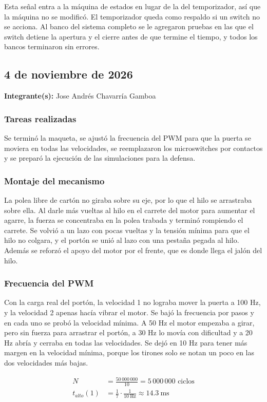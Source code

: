 \documentclass[11pt,letterpaper]{article}
\newcommand{\entrada}[2]{%
  \subsection*{#1}%
  \addcontentsline{toc}{subsection}{#1}%
  \noindent\textbf{Integrante(s):} #2\par\medskip
}
\begin{document}
Esta señal entra a la máquina de estados en lugar de la del temporizador, así que la máquina no se modificó. El temporizador queda como respaldo si un switch no se acciona. Al banco del sistema completo se le agregaron pruebas en las que el switch detiene la apertura y el cierre antes de que termine el tiempo, y todos los bancos terminaron sin errores.

\entrada{4 de noviembre de 2026}{Jose Andrés Chavarría Gamboa}

\subsubsection*{Tareas realizadas}

Se terminó la maqueta, se ajustó la frecuencia del PWM para que la puerta se moviera en todas las velocidades, se reemplazaron los microswitches por contactos y se preparó la ejecución de las simulaciones para la defensa.

\subsubsection*{Montaje del mecanismo}

La polea libre de cartón no giraba sobre su eje, por lo que el hilo se arrastraba sobre ella. Al darle más vueltas al hilo en el carrete del motor para aumentar el agarre, la fuerza se concentraba en la polea trabada y terminó rompiendo el carrete. Se volvió a un lazo con pocas vueltas y la tensión mínima para que el hilo no colgara, y el portón se unió al lazo con una pestaña pegada al hilo. Además se reforzó el apoyo del motor por el frente, que es donde llega el jalón del hilo.

\subsubsection*{Frecuencia del PWM}

Con la carga real del portón, la velocidad 1 no lograba mover la puerta a 100 Hz, y la velocidad 2 apenas hacía vibrar el motor. Se bajó la frecuencia por pasos y en cada uno se probó la velocidad mínima. A 50 Hz el motor empezaba a girar, pero sin fuerza para arrastrar el portón, a 30 Hz lo movía con dificultad y a 20 Hz abría y cerraba en todas las velocidades. Se dejó en 10 Hz para tener más margen en la velocidad mínima, porque los tirones solo se notan un poco en las dos velocidades más bajas.

\begin{align*}
N &= \frac{50\,000\,000}{10} = 5\,000\,000 \text{ ciclos} \\
t_{alto}(1) &= \frac{1}{7} \cdot \frac{1}{10\ \text{Hz}} \approx 14.3\ \text{ms}
\end{align*}
\end{document}
